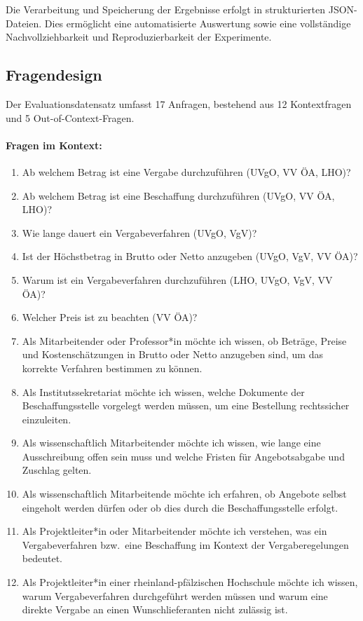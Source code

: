 \documentclass[12pt,a4paper]{scrreprt}
\begin{document}
Die Verarbeitung und Speicherung der Ergebnisse erfolgt in strukturierten JSON-Dateien. Dies ermöglicht eine automatisierte Auswertung sowie eine vollständige Nachvollziehbarkeit und Reproduzierbarkeit der Experimente.

\subsection{Fragendesign}

Der Evaluationsdatensatz umfasst 17 Anfragen, bestehend aus 12 Kontextfragen und 5 Out-of-Context-Fragen.

\paragraph{Fragen im Kontext:}
\begin{enumerate}
  \item Ab welchem Betrag ist eine Vergabe durchzuführen (UVgO, VV ÖA, LHO)?
  \item Ab welchem Betrag ist eine Beschaffung durchzuführen (UVgO, VV ÖA, LHO)?
  \item Wie lange dauert ein Vergabeverfahren (UVgO, VgV)?
  \item Ist der Höchstbetrag in Brutto oder Netto anzugeben (UVgO, VgV, VV ÖA)?
  \item Warum ist ein Vergabeverfahren durchzuführen (LHO, UVgO, VgV, VV ÖA)?
  \item Welcher Preis ist zu beachten (VV ÖA)?
  \item Als Mitarbeitender oder Professor*in möchte ich wissen, ob Beträge, Preise und Kostenschätzungen in Brutto oder Netto anzugeben sind, um das korrekte Verfahren bestimmen zu können.
  \item Als Institutssekretariat möchte ich wissen, welche Dokumente der Beschaffungsstelle vorgelegt werden müssen, um eine Bestellung rechtssicher einzuleiten.
  \item Als wissenschaftlich Mitarbeitender möchte ich wissen, wie lange eine Ausschreibung offen sein muss und welche Fristen für Angebotsabgabe und Zuschlag gelten.
  \item Als wissenschaftlich Mitarbeitende möchte ich erfahren, ob Angebote selbst eingeholt werden dürfen oder ob dies durch die Beschaffungsstelle erfolgt.
  \item Als Projektleiter*in oder Mitarbeitender möchte ich verstehen, was ein Vergabeverfahren bzw.\ eine Beschaffung im Kontext der Vergaberegelungen bedeutet.
  \item Als Projektleiter*in einer rheinland-pfälzischen Hochschule möchte ich wissen, warum Vergabeverfahren durchgeführt werden müssen und warum eine direkte Vergabe an einen Wunschlieferanten nicht zulässig ist.
\end{enumerate}
\end{document}
